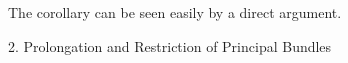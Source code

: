 The corollary can be seen easily by a direct argument.

2. Prolongation and Restriction of Principal Bundles
